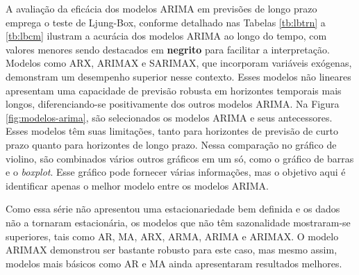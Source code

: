 A avaliação da eficácia dos modelos ARIMA em previsões de longo prazo emprega o teste de Ljung-Box, conforme detalhado nas Tabelas \ref{tb:lbtrn} a \ref{tb:lbcm} ilustram a acurácia dos modelos ARIMA ao longo do tempo, com valores menores sendo destacados em \textbf{negrito}  para facilitar a interpretação. Modelos como ARX, ARIMAX e SARIMAX, que incorporam variáveis exógenas, demonstram um desempenho superior nesse contexto. Esses modelos não lineares apresentam uma capacidade de previsão robusta em horizontes temporais mais longos, diferenciando-se positivamente dos outros modelos ARIMA. Na Figura \ref{fig:modelos-arima}, são selecionados os modelos ARIMA e seus antecessores. Esses modelos têm suas limitações, tanto para horizontes de previsão de curto prazo quanto para horizontes de longo prazo. Nessa comparação no gráfico de violino, são combinados vários outros gráficos em um só, como o gráfico de barras e o \textit{boxplot}. Esse gráfico pode fornecer várias informações, mas o objetivo aqui é identificar apenas o melhor modelo entre os modelos ARIMA.

Como essa série não apresentou uma estacionariedade bem definida e os dados não a tornaram estacionária, os modelos que não têm sazonalidade mostraram-se superiores, tais como AR, MA, ARX, ARMA, ARIMA e ARIMAX. O modelo ARIMAX demonstrou ser bastante robusto para este caso, mas mesmo assim, modelos mais básicos como AR e MA ainda apresentaram resultados melhores.

